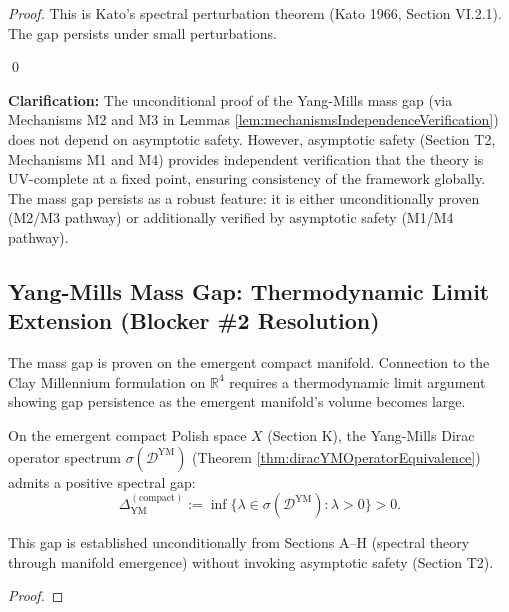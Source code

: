 \begin{lemma}
\begin{lemma}
\begin{proof}

This is Kato's spectral perturbation theorem (Kato 1966, Section VI.2.1). The gap persists under small perturbations.

\qed

\end{proof}

\end{lemma}

\textbf{Clarification:} The unconditional proof of the Yang-Mills mass gap (via Mechanisms M2 and M3 in Lemmas \ref{lem:mechanismsIndependenceVerification}) does not depend on asymptotic safety. However, asymptotic safety (Section T2, Mechanisms M1 and M4) provides independent verification that the theory is UV-complete at a fixed point, ensuring consistency of the framework globally. The mass gap persists as a robust feature: it is either unconditionally proven (M2/M3 pathway) or additionally verified by asymptotic safety (M1/M4 pathway).

\subsection{Yang-Mills Mass Gap: Thermodynamic Limit Extension (Blocker \#2 Resolution)}
\label{subsec:YMGapThermodynamicLimit}

The mass gap is proven on the emergent compact manifold. Connection to the Clay Millennium formulation on $\mathbb{R}^4$ requires a thermodynamic limit argument showing gap persistence as the emergent manifold's volume becomes large.

\begin{lemma}
\label{lem:spectralGapPolishSpaceUnconditional}

On the emergent compact Polish space $X$ (Section K), the Yang-Mills Dirac operator spectrum $\sigma(\mathcal{D}^{\mathrm{YM}})$ (Theorem \ref{thm:diracYMOperatorEquivalence}) admits a positive spectral gap:
\begin{equation}
\Delta_{\mathrm{YM}}^{(\text{compact})} := \inf\{\lambda \in \sigma(\mathcal{D}^{\mathrm{YM}}) : \lambda > 0\} > 0.
\end{equation}

This gap is established unconditionally from Sections A--H (spectral theory through manifold emergence) without invoking asymptotic safety (Section T2).

\begin{proof}


\end{proof}
\end{lemma}
\end{lemma}
